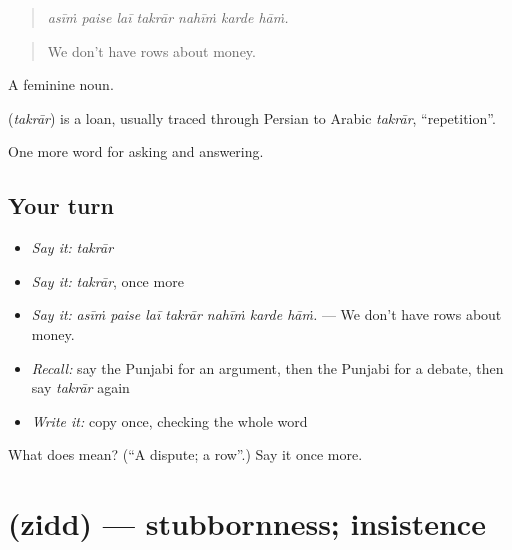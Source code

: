 \begin{quote}
      
\end{quote}

\begin{quote}
\emph{asīṁ paise laī takrār nahīṁ karde hāṁ.}
\end{quote}

\begin{quote}
We don't have rows about money.
\end{quote}

A feminine noun.

\begin{cousinweb}
\textbf{} (\emph{takrār}) is a loan, usually traced through Persian to Arabic \emph{takrār}, \textquotedblleft{}repetition\textquotedblright{}.
\end{cousinweb}

\begin{grammarlens}[title={What you've built}]
One more word for asking and answering.
\end{grammarlens}

\subsection*{Your turn}
\begin{itemize}
\raggedright
  \item \emph{Say it:} \emph{takrār}
  \item \emph{Say it:} \emph{takrār}, once more
  \item \emph{Say it:} \emph{asīṁ paise laī takrār nahīṁ karde hāṁ.} — We don't have rows about money.
  \item \emph{Recall:} say the Punjabi for an argument, then the Punjabi for a debate, then say \emph{takrār} again
  \item \emph{Write it:} copy \textbf{} once, checking the whole word
\end{itemize}

\begin{tcolorbox}[breakable,colback=teal!4,colframe=teal!35!black,title={Before you move on}]
What does  mean? (\textquotedblleft{}A dispute; a row\textquotedblright{}.) Say it once more.
\end{tcolorbox}
\section[\texorpdfstring{\pa{ਜ਼ਿੱਦ} (zidd)}{ਜ਼ਿੱਦ (zidd)}]{ (zidd) — stubbornness; insistence}

